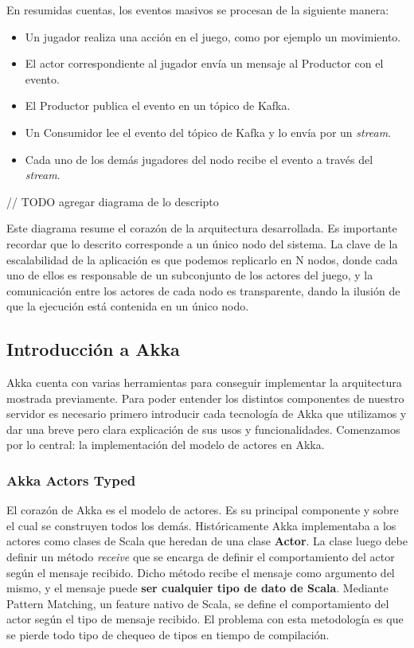 En resumidas cuentas, los eventos masivos se procesan de la siguiente manera:

\begin{itemize}
    \item Un jugador realiza una acción en el juego, como por ejemplo un movimiento.
    \item El actor correspondiente al jugador envía un mensaje al Productor con el evento.
    \item El Productor publica el evento en un tópico de Kafka.
    \item Un Consumidor lee el evento del tópico de Kafka y lo envía por un \textit{stream}.
    \item Cada uno de los demás jugadores del nodo recibe el evento a través del \textit{stream}.
\end{itemize}

// TODO agregar diagrama de lo descripto

Este diagrama resume el corazón de la arquitectura desarrollada. Es importante recordar que lo descrito corresponde a un único nodo del sistema.
La clave de la escalabilidad de la aplicación es que podemos replicarlo en N nodos, donde cada uno de ellos es responsable de un subconjunto de los actores del juego,
y la comunicación entre los actores de cada nodo es transparente, dando la ilusión de que la ejecución está contenida en un único nodo.

\subsection{Introducción a Akka}

\noindent Akka cuenta con varias herramientas para conseguir implementar la arquitectura mostrada previamente. Para poder entender los distintos componentes de nuestro servidor
es necesario primero introducir cada tecnología de Akka que utilizamos y dar una breve pero clara explicación de sus usos y funcionalidades.
Comenzamos por lo central: la implementación del modelo de actores en Akka. 

\subsubsection{Akka Actors Typed}

\noindent El corazón de Akka es el modelo de actores. Es su principal componente y sobre el cual se construyen todos los demás.
Históricamente Akka implementaba a los actores como clases de Scala que heredan de una clase \textbf{Actor}.
La clase luego debe definir un método \textit{receive} que se encarga de definir el comportamiento del actor según el mensaje recibido.
Dicho método recibe el mensaje como argumento del mismo, y el mensaje puede \textbf{ser cualquier tipo de dato de Scala}.
Mediante Pattern Matching, un feature nativo de Scala, se define el comportamiento del actor según el tipo de mensaje recibido.
El problema con esta metodología es que se pierde todo tipo de chequeo de tipos en tiempo de compilación.

